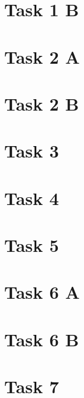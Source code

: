 \section{Task 1 B}


\section{Task 2 A}


\section{Task 2 B}


\section{Task 3}


\section{Task 4}


\section{Task 5}


\section{Task 6 A}


\section{Task 6 B}


\section{Task 7}


